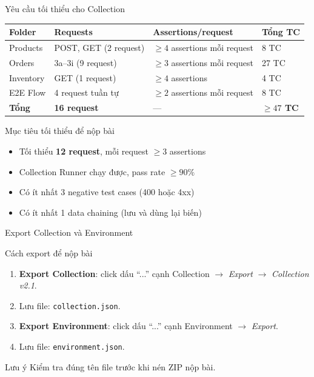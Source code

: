 \documentclass[aspectratio=169,10pt]{beamer}
\begin{document}
\begin{frame}{Yêu cầu tối thiểu cho Collection}
  \begin{center}
  \small
  \begin{tabular}{p{2cm}p{3cm}p{3.5cm}p{2cm}}
    \toprule
    \textbf{Folder} & \textbf{Requests} & \textbf{Assertions/request} & \textbf{Tổng TC} \\
    \midrule
    Products  & POST, GET (2 request) & $\geq 4$ assertions mỗi request & 8 TC \\
    Orders    & 3a--3i (9 request) & $\geq 3$ assertions mỗi request & 27 TC \\
    Inventory & GET (1 request) & $\geq 4$ assertions & 4 TC \\
    E2E Flow  & 4 request tuần tự & $\geq 2$ assertions mỗi request & 8 TC \\
    \midrule
    \textbf{Tổng} & \textbf{16 request} & --- & \textbf{$\geq 47$ TC} \\
    \bottomrule
  \end{tabular}
  \end{center}

  \vspace{0.3em}
  \begin{block}{Mục tiêu tối thiểu để nộp bài}
    \begin{itemize}
      \item Tối thiểu \textbf{12 request}, mỗi request $\geq 3$ assertions
      \item Collection Runner chạy được, pass rate $\geq 90\%$
      \item Có ít nhất 3 negative test cases (400 hoặc 4xx)
      \item Có ít nhất 1 data chaining (lưu và dùng lại biến)
    \end{itemize}
  \end{block}
\end{frame}

\begin{frame}{Export Collection và Environment}
  \begin{block}{Cách export để nộp bài}
    \begin{enumerate}
      \item \textbf{Export Collection}: click dấu ``...'' cạnh Collection
        $\to$ \textit{Export} $\to$ \textit{Collection v2.1}.
      \item Lưu file: \texttt{collection.json}.
      \item \textbf{Export Environment}: click dấu ``...'' cạnh Environment
        $\to$ \textit{Export}.
      \item Lưu file: \texttt{environment.json}.
    \end{enumerate}
  \end{block}

  \begin{alertblock}{Lưu ý}
    Kiểm tra đúng tên file trước khi nén ZIP nộp bài.
  \end{alertblock}
\end{frame}
\end{document}

